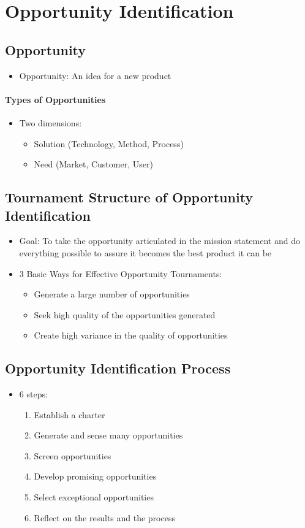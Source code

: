 \documentclass[a4paper,12pt,openany]{book}
\begin{document}
\chapter{Opportunity Identification}
\section{Opportunity}
\begin{itemize}
    \item Opportunity: An idea for a new product
\end{itemize}
\subsubsection{Types of Opportunities}
\begin{itemize}
    \item Two dimensions:
    \begin{itemize}
        \item Solution (Technology, Method, Process)
        \item Need (Market, Customer, User)
    \end{itemize}
\end{itemize}

\section{Tournament Structure of Opportunity Identification}
\begin{itemize}
    \item Goal: To take the opportunity articulated in the mission statement and do everything possible to assure it becomes the best product it can be
    \item 3 Basic Ways for Effective Opportunity Tournaments:
    \begin{itemize}
        \item Generate a large number of opportunities
        \item Seek high quality of the opportunities generated
        \item Create high variance in the quality of opportunities
    \end{itemize}
\end{itemize}

\section{Opportunity Identification Process}
\begin{itemize}
    \item 6 steps:
    \begin{enumerate}
        \item Establish a charter
        \item Generate and sense many opportunities
        \item Screen opportunities
        \item Develop promising opportunities
        \item Select exceptional opportunities
        \item Reflect on the results and the process
    \end{enumerate}
\end{itemize}
\end{document}
